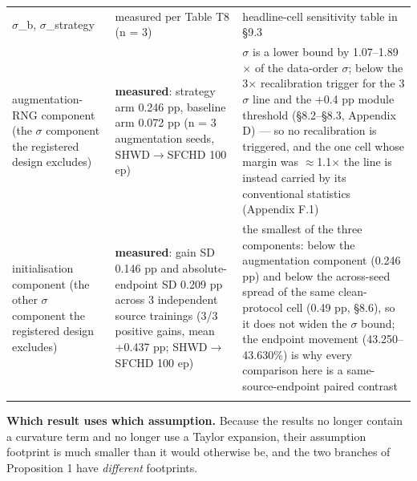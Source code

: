 \documentclass[pdflatex,sn-mathphys-ay]{sn-jnl}
\begin{document}
{\begin{longtable}{p{}p{}p{}}
\ensuremath{\sigma}\_b, \ensuremath{\sigma}\_strategy & measured per Table T8 (n = 3) & headline-cell sensitivity table in \S{}9.3 \\
augmentation-RNG component (the \ensuremath{\sigma} component the registered design excludes) & \textbf{measured}: strategy arm 0.246 pp, baseline arm 0.072 pp (n = 3 augmentation seeds, SHWD\ensuremath{\rightarrow}SFCHD 100 ep) & \ensuremath{\sigma} is a lower bound by 1.07--1.89\ensuremath{\times} of the data-order \ensuremath{\sigma}; below the 3\ensuremath{\times} recalibration trigger for the 3\ensuremath{\sigma} line and the +0.4 pp module threshold (\S{}8.2--\S{}8.3, Appendix D) --- so no recalibration is triggered, and the one cell whose margin was \ensuremath{\approx}1.1\ensuremath{\times} the line is instead carried by its conventional statistics (Appendix F.1) \\
initialisation component (the other \ensuremath{\sigma} component the registered design excludes) & \textbf{measured}: gain SD 0.146 pp and absolute-endpoint SD 0.209 pp across 3 independent source trainings (3/3 positive gains, mean +0.437 pp; SHWD\ensuremath{\rightarrow}SFCHD 100 ep) & the smallest of the three components: below the augmentation component (0.246 pp) and below the across-seed spread of the same clean-protocol cell (0.49 pp, \S{}8.6), so it does not widen the \ensuremath{\sigma} bound; the endpoint movement (43.250--43.630\%) is why every comparison here is a same-source-endpoint paired contrast \\
\botrule
\end{longtable}}

\textbf{Which result uses which assumption.} Because the results no longer contain a curvature term and no longer use a Taylor expansion, their assumption footprint is much smaller than it would otherwise be, and the two branches of Proposition 1 have \emph{different} footprints.
\end{document}
